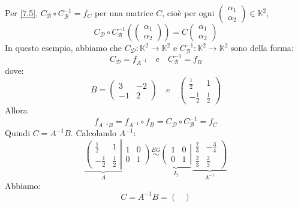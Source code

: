 \documentclass[a4paper]{article}
\theoremstyle{break}
\theoremstyle{break}
\theoremstyle{break}
\theoremstyle{break}
\begin{document}
\begin{example}
\noindent Per \ref{7.5}, \( C_{\mathcal{B}} \circ C_{\mathcal{B}}^{-1} = f_C \) per una matrice
\( C \), cioè per ogni \( \begin{pmatrix} \alpha_1\\ \alpha_2 \end{pmatrix} \in \mathbb{K}^2 \),
\[
  C_{\mathcal{D}} \circ C_{\mathcal{B}}^{-1} \left( \begin{pmatrix} 
      \alpha_1\\
      \alpha_2
  \end{pmatrix}  \right) = C \begin{pmatrix} 
    \alpha_1\\
    \alpha_2
  \end{pmatrix}
\] 
In questo esempio, abbiamo che \( C_{\mathcal{D}}: \mathbb{K}^2 \to \mathbb{K}^2 \) e
\( C_{\mathcal{B}}^{-1}: \mathbb{K}^2 \to \mathbb{K}^2 \) sono della forma:
\[
  C_{\mathcal{D}} = f_{A^{-1}} \quad e \quad C_{\mathcal{B}}^{-1} = f_B
\] 
dove:
\[
  B = \begin{pmatrix} 
    3 & -2\\
    -1 & 2
  \end{pmatrix} 
  \quad e \quad
  \begin{pmatrix} 
    \frac{1}{2} & 1\\
    -\frac{1}{2} & \frac{1}{2}
  \end{pmatrix} 
\] 
Allora 
\[
  f_{A^{-1}B} = f_{A^{-1}} \circ f_B = C_{\mathcal{D}} \circ C_{\mathcal{B}}^{-1} = f_C
\] 
Quindi \( C = A^{-1}B \). Calcolando \( A^{-1} \):
\[
  \underbrace{
  \left(
  \begin{array}{cc}
    \frac{1}{2} & 1\\
    -\frac{1}{2} & \frac{1}{2}
  \end{array}
  \right|
  }_{A}
    \left.
      \begin{array}{cc}
        1 & 0\\
        0 & 1
      \end{array}
    \right)
    \stackrel{EG}{\sim}
  \underbrace{
  \left(
  \begin{array}{cc}
    1 & 0\\
    0 & 1
  \end{array}
  \right|
  }_{I_2}
  \underbrace{
    \left.
      \begin{array}{cc}
        \frac{2}{3} & -\frac{3}{4}\\
        \frac{2}{3} & \frac{2}{3}
      \end{array}
    \right)
  }_{A^{-1}}
\] 
Abbiamo:
\[
  C = A^{-1}B = \begin{pmatrix} 

\end{pmatrix}\]
\end{example}
\end{document}
